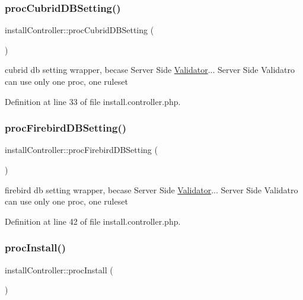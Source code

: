 \subsubsection{\texorpdfstring{proc\+Cubrid\+D\+B\+Setting()}{procCubridDBSetting()}}
{\footnotesize\ttfamily install\+Controller\+::proc\+Cubrid\+D\+B\+Setting (\begin{DoxyParamCaption}{ }\end{DoxyParamCaption})}



cubrid db setting wrapper, becase Server Side \hyperlink{classValidator}{Validator}... Server Side Validatro can use only one proc, one ruleset 



Definition at line 33 of file install.\+controller.\+php.

\mbox{\label{classinstallController_a243cf71fa5653d7cbf2d5583effefb95}} 
\subsubsection{\texorpdfstring{proc\+Firebird\+D\+B\+Setting()}{procFirebirdDBSetting()}}
{\footnotesize\ttfamily install\+Controller\+::proc\+Firebird\+D\+B\+Setting (\begin{DoxyParamCaption}{ }\end{DoxyParamCaption})}



firebird db setting wrapper, becase Server Side \hyperlink{classValidator}{Validator}... Server Side Validatro can use only one proc, one ruleset 



Definition at line 42 of file install.\+controller.\+php.

\mbox{\label{classinstallController_a41026755146b829fe87b83bca3962938}} 
\subsubsection{\texorpdfstring{proc\+Install()}{procInstall()}}
{\footnotesize\ttfamily install\+Controller\+::proc\+Install (\begin{DoxyParamCaption}{ }\end{DoxyParamCaption})}



